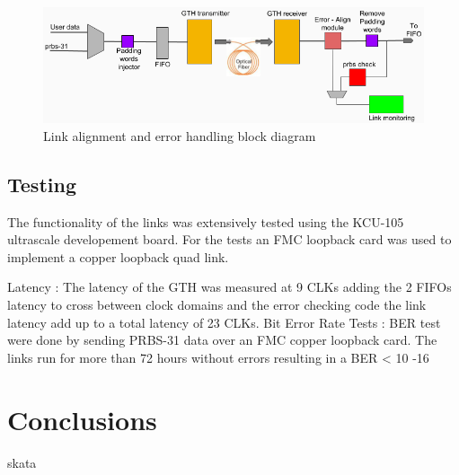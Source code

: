 \documentclass[a4paper]{PoS}
\begin{document}
\begin{figure}
\centering
\includegraphics[width=1\textwidth]{link_align.png}
\caption{Link alignment and error handling block diagram}
\label{align}
\end{figure}


\subsection{Testing}
The functionality of the links was extensively tested using the KCU-105 ultrascale developement board. For the tests an FMC loopback card was used to implement a copper loopback quad link.

Latency :
The latency of the GTH was measured at 9 CLKs adding the 2 FIFOs latency to cross between clock domains and the error checking code the link latency add up to a total latency of 23 CLKs. 
Bit Error Rate Tests :
BER test were done by sending PRBS-31 data over an FMC copper loopback card. The links run for more than 72 hours without errors resulting in a BER < 10 -16


\section{Conclusions}

skata \cite{skata}



\end{document}

